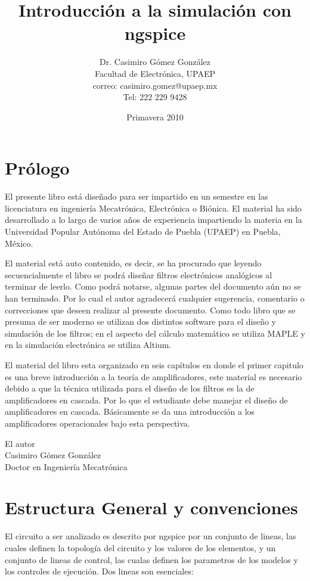 \documentclass[12pt]{book}
\title{Introducción a la simulación con ngspice}
\author{Dr. Casimiro Gómez González\\
	Facultad de Electrónica, UPAEP\\
               correo: casimiro.gomez@upaep.mx\\
               Tel: 222 229 9428}
\date{Primavera 2010}
\theoremstyle{definition}
\theoremstyle{remark}
\theoremstyle{plain}
\begin{document}
\frontmatter
\maketitle


\chapter{Prólogo}

El presente libro está diseñado para ser impartido en un semestre en las licenciatura en ingeniería Mecatrónica, Electrónica o Biónica. El material ha sido desarrollado a lo largo de varios años de experiencia impartiendo la materia en la Universidad Popular Autónoma del Estado de Puebla (UPAEP) en Puebla, México.

El material está auto contenido, es decir, se ha procurado que leyendo secuencialmente el libro se podrá diseñar filtros electrónicos analógicos al terminar de leerlo. Como podrá notarse, algunas partes del documento aún no se han terminado. Por lo cual el autor agradecerá cualquier sugerencia, comentario o correcciones que deseen realizar al presente documento. Como todo libro que se presuma de ser moderno se utilizan dos distintos software para el diseño y simulación de los filtros; en el aspecto del cálculo matemático se utiliza MAPLE  y en la simulación electrónica se utiliza Altium.

El material del libro esta organizado en seis capítulos en donde el primer capitulo es una breve introducción a la teoría de amplificadores, este material es necesario debido a que la técnica utilizada para el diseño de los filtros es la de amplificadores en cascada. Por lo que el estudiante debe manejar el diseño de amplificadores en cascada. Básicamente se da una introducción a los amplificadores operacionales bajo esta perspectiva.


\begin{flushright}

El autor\\
Casimiro Gómez González\\
Doctor en Ingeniería Mecatrónica
\end{flushright}

\tableofcontents

\mainmatter
\chapter{Estructura General y convenciones}
El circuito a ser analizado es descrito por ngspice por un conjunto de lineas, las cuales definen la topología del circuito y los valores de los elementos, y un conjunto de lineas de control, las cualas definen los parametros de los modelos y los controles de ejecución. Dos lineas son esenciales:
\end{document}
